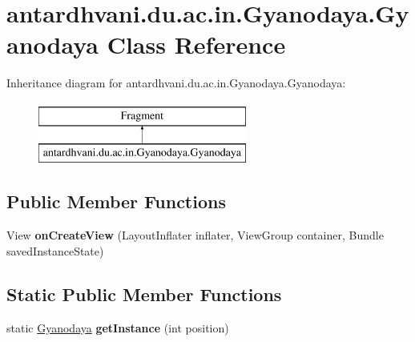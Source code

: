 \hypertarget{classantardhvani_1_1du_1_1ac_1_1in_1_1_gyanodaya_1_1_gyanodaya}{}\section{antardhvani.\+du.\+ac.\+in.\+Gyanodaya.\+Gyanodaya Class Reference}
\label{classantardhvani_1_1du_1_1ac_1_1in_1_1_gyanodaya_1_1_gyanodaya}
Inheritance diagram for antardhvani.\+du.\+ac.\+in.\+Gyanodaya.\+Gyanodaya\+:\begin{figure}[H]
\begin{center}
\leavevmode
\includegraphics[height=2.000000cm]{classantardhvani_1_1du_1_1ac_1_1in_1_1_gyanodaya_1_1_gyanodaya}
\end{center}
\end{figure}
\subsection*{Public Member Functions}
\begin{DoxyCompactItemize}
\item 
\hypertarget{classantardhvani_1_1du_1_1ac_1_1in_1_1_gyanodaya_1_1_gyanodaya_a996e904111304cec8d08e2d08cc574c2}{}View {\bfseries on\+Create\+View} (Layout\+Inflater inflater, View\+Group container, Bundle saved\+Instance\+State)\label{classantardhvani_1_1du_1_1ac_1_1in_1_1_gyanodaya_1_1_gyanodaya_a996e904111304cec8d08e2d08cc574c2}

\end{DoxyCompactItemize}
\subsection*{Static Public Member Functions}
\begin{DoxyCompactItemize}
\item 
\hypertarget{classantardhvani_1_1du_1_1ac_1_1in_1_1_gyanodaya_1_1_gyanodaya_ac5184ce6d744c1db9fd43fef236e5207}{}static \hyperlink{classantardhvani_1_1du_1_1ac_1_1in_1_1_gyanodaya_1_1_gyanodaya}{Gyanodaya} {\bfseries get\+Instance} (int position)\label{classantardhvani_1_1du_1_1ac_1_1in_1_1_gyanodaya_1_1_gyanodaya_ac5184ce6d744c1db9fd43fef236e5207}

\end{DoxyCompactItemize}
